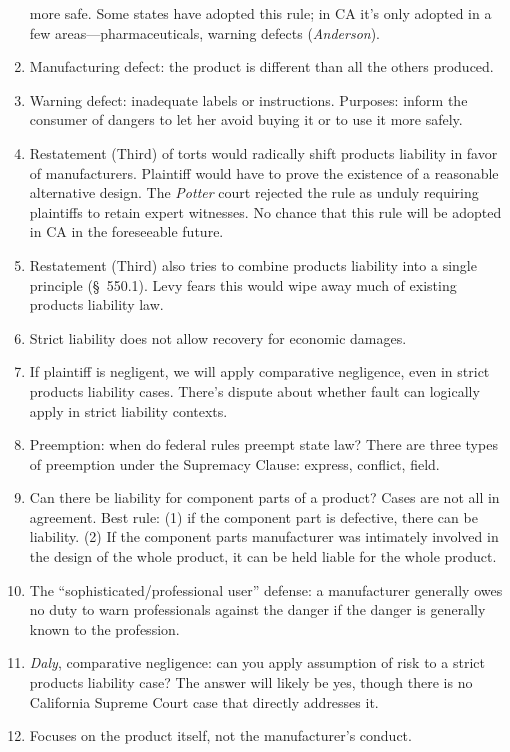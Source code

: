 \begin{enumerate}
    more safe. Some 
    states have adopted this rule; in CA it's only adopted in a few 
    areas---pharmaceuticals, warning defects (\emph{Anderson}).
    \item Manufacturing defect: the product is different than all the others 
    produced.
    \item Warning defect: inadequate labels or instructions. Purposes: inform 
    the consumer of dangers to let her avoid buying it or to use it more safely.
    \item Restatement (Third) of torts would radically shift products liability 
    in favor of manufacturers. Plaintiff would have to prove the existence of a 
    reasonable alternative design. The \emph{Potter} court rejected the rule as 
    unduly requiring plaintiffs to retain expert witnesses. No chance that this 
    rule will be adopted in CA in the foreseeable future.
    \item Restatement (Third) also tries to combine products liability into a 
    single principle (\S\ 550.1). Levy fears this would wipe away much of 
    existing products liability law.
    \item Strict liability does not allow recovery for economic damages.
    \item If plaintiff is negligent, we will apply comparative negligence, even 
    in strict products liability cases. There's dispute about whether fault can 
    logically apply in strict liability contexts.
    \item Preemption: when do federal rules preempt state law? There are three 
    types of preemption under the Supremacy Clause: express, conflict, field.
    \item Can there be liability for component parts of a product? Cases are not 
    all in agreement. Best rule: (1) if the component part is defective, there 
    can be liability. (2) If the component parts manufacturer was intimately 
    involved in the design of the whole product, it can be held liable for the 
    whole product.
    \item The ``sophisticated/professional user'' defense: a manufacturer 
    generally owes no duty to warn professionals against the danger if the 
    danger is generally known to the profession.
    \item \emph{Daly}, comparative negligence: can you apply assumption of risk 
    to a strict products liability case? The answer will likely be yes, though 
    there is no California Supreme Court case that directly addresses it.
    \item Focuses on the product itself, not the manufacturer's conduct.
\end{enumerate}

